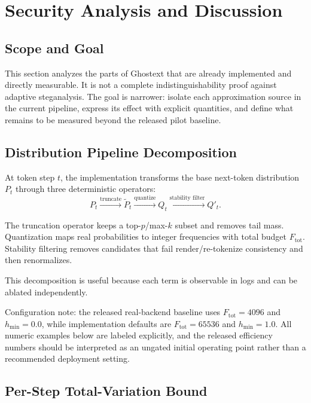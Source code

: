\section{Security Analysis and Discussion}
\label{sec:analysis}

\subsection{Scope and Goal}

This section analyzes the parts of Ghostext that are already implemented and directly measurable. It is not a complete indistinguishability proof against adaptive steganalysis. The goal is narrower: isolate each approximation source in the current pipeline, express its effect with explicit quantities, and define what remains to be measured beyond the released pilot baseline.

\subsection{Distribution Pipeline Decomposition}

At token step $t$, the implementation transforms the base next-token distribution $P_t$ through three deterministic operators:
\begin{equation}
P_t \xrightarrow{\text{truncate}} \widetilde{P}_t \xrightarrow{\text{quantize}} Q_t \xrightarrow{\text{stability filter}} Q'_t.
\end{equation}

The truncation operator keeps a top-$p$/max-$k$ subset and removes tail mass. Quantization maps real probabilities to integer frequencies with total budget $F_{\mathrm{tot}}$. Stability filtering removes candidates that fail render/re-tokenize consistency and then renormalizes.

This decomposition is useful because each term is observable in logs and can be ablated independently.

Configuration note: the released real-backend baseline uses $F_{\mathrm{tot}}=4096$ and $h_{\min}=0.0$, while implementation defaults are $F_{\mathrm{tot}}=65536$ and $h_{\min}=1.0$. All numeric examples below are labeled explicitly, and the released efficiency numbers should be interpreted as an ungated initial operating point rather than a recommended deployment setting.

\subsection{Per-Step Total-Variation Bound}


